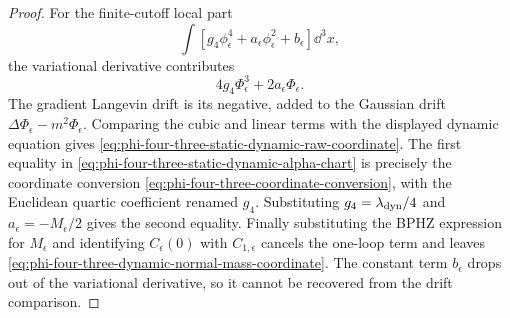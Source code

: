 \begin{proof}
For the finite-cutoff local part
\[
  \int
  \left[
    g_4\phi_\epsilon^4+a_\epsilon\phi_\epsilon^2+b_\epsilon
  \right]\dd^3x ,
\]
the variational derivative contributes
\[
  4g_4\Phi_\epsilon^3+2a_\epsilon\Phi_\epsilon .
\]
The gradient Langevin drift is its negative, added to the Gaussian drift
\(\Delta\Phi_\epsilon-m^2\Phi_\epsilon\).  Comparing the cubic and linear
terms with the displayed dynamic equation gives
\eqref{eq:phi-four-three-static-dynamic-raw-coordinate}.  The first equality in
\eqref{eq:phi-four-three-static-dynamic-alpha-chart} is precisely the
coordinate conversion \eqref{eq:phi-four-three-coordinate-conversion}, with
the Euclidean quartic coefficient renamed \(g_4\).  Substituting
\(g_4=\lambda_{\rm dyn}/4\) and \(a_\epsilon=-M_\epsilon/2\) gives the second
equality.  Finally substituting the BPHZ expression for \(M_\epsilon\) and
identifying \(C_\epsilon(0)\) with \(C_{1,\epsilon}\) cancels the one-loop
term and leaves \eqref{eq:phi-four-three-dynamic-normal-mass-coordinate}.
The constant term \(b_\epsilon\) drops out of the variational derivative, so it
cannot be recovered from the drift comparison.
\end{proof}


